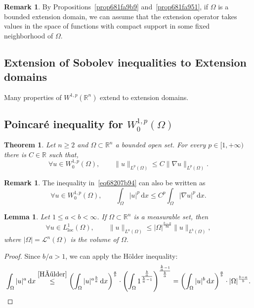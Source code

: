 \documentclass[a4paper,9pt]{amsart}
\newcommand{\scr}[1]{\mathscr{#1}}
\newcommand{\R}{\mathbb{R}}	%
\newcommand{\did}{\,\mathrm{d}}	%
\newcommand{\loc}{\mathrm{loc}}
\newcommand{\grad}{\nabla}
\theoremstyle{plain}
\newtheorem{theorem}[proposition]{Theorem}
\newtheorem{lemma}[proposition]{Lemma}
\theoremstyle{definition}
\newtheorem{remark}[proposition]{Remark}
\theoremstyle{remark}
\begin{document}
\begin{remark}
	By Propositions~\ref{prop681fa9b9} and~\ref{prop681fa951}, if $\Omega$ is a bounded extension domain, we can assume that the extension operator takes values in the space of functions with compact support in some fixed neighborhood of $\Omega$.
\end{remark}

\subsection{Extension of Sobolev inequalities to Extension domains}
Many properties of $W^{1,p}(\R^n)$ extend to extension domains.

\subsection{Poincaré inequality for $W^{1,p}_0(\Omega)$}\label{subs68208317}

\begin{theorem}\label{thm68207b9a}
	Let $n\ge2$ and $\Omega\subset\R^n$ a bounded open set.
	For every $p\in[1,+\infty)$ there is $C\in\R$ such that, 
	\begin{equation}\label{eq68207b94}
		\forall u\in W^{1,p}_0(\Omega),\qquad
		\|u\|_{L^p(\Omega)} \le C\|\grad u\|_{L^p(\Omega)} .
	\end{equation}
\end{theorem}
\begin{remark}
	The inequality in~\eqref{eq68207b94} can also be written as
	\begin{equation}
		\forall u\in W^{1,p}_0(\Omega),\qquad
		\int_\Omega |u|^p \did x \le C^p \int_\Omega |\grad u|^p\did x .
	\end{equation}
\end{remark}

\begin{lemma}\label{lem68207e48}
	Let $1\le a<b<\infty$.
	If $\Omega\subset\R^n$ is a measurable set, then
	\begin{equation}\label{eq68207e42}
		\forall u\in L^1_\loc(\Omega),\qquad
		\|u\|_{L^a(\Omega)} \le |\Omega|^{\frac{b-a}{ba}} \|u\|_{L^b(\Omega)} ,
	\end{equation}
	where $|\Omega|=\scr L^n(\Omega)$ is the volume of $\Omega$.
\end{lemma}
\begin{proof}
	Since $b/a>1$, we can apply the Hölder inequality:
	\begin{align}
		\int_\Omega |u|^a \did x
		\overset{\eqref{Hölder}}\le \left( \int_\Omega |u|^{a\frac{b}{a}} \did x \right)^{\frac{a}{b}} 
			\cdot \left( \int_\Omega 1^{\frac{\frac{b}{a}}{\frac{b}{a}-1}} \right)^{\frac{\frac{b}{a}-1}{\frac{b}{a}}}
		= \left( \int_\Omega |u|^{b} \did x \right)^{\frac{a}{b}} 
			\cdot |\Omega|^{\frac{b-a}{b}} .
	\end{align}
\end{proof}
\end{document}
